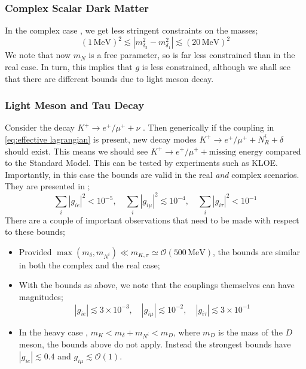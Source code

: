 \documentclass[11pt]{article}
\numberwithin{equation}{section}
\numberwithin{figure}{section}
\numberwithin{table}{section}
\newcommand{\mO}{\mathcal{O}}
\newcommand{\Abs}[1]{\left| #1 \right|}
\begin{document}
\subsubsection*{Complex Scalar Dark Matter}
In the complex case \cite{Boehm2006}, we get less stringent constraints on the masses;
  \begin{equation}
    (1\, \text{MeV})^2 \lesssim \Abs{m_{\delta_2}^2 - m_{\delta_1}^2} \lesssim (20 \, \text{MeV})^2
  \end{equation}
\noindent We note that now $m_N$ is a free parameter, so is far less constrained than in the real case. In turn, this implies that $g$ is less constrained, although we shall see that there are different bounds due to light meson decay.



\subsubsection{Light Meson and Tau Decay}


Consider the decay $K^+ \rightarrow e^+/\mu^+ + \nu$ \cite{Farzan2011, Farzan2014, Farzan2010}. Then generically if the coupling in \eqref{eq:effective lagrangian} is present, new decay modes $K^+ \rightarrow e^+/\mu^+ + N^i_R + \delta$ should exist. This means we should see $K^+ \rightarrow e^+/\mu^+ + \text{missing energy}$ compared to the Standard Model. This can be tested by experiments such as KLOE. Importantly, in this case the bounds are valid in the real \emph{and} complex scenarios. They are presented in \cite{Farzan2011, Farzan2014, Farzan2010, Artamonov2016};
  \begin{equation}
    \sum_{i}{\Abs{g_{ie}}^2} < 10^{-5}, \quad \sum_{i}{\Abs{g_{i\mu}}^2} \lesssim 10^{-4}, \quad \sum_{i}{\Abs{g_{i\tau}}^2} < 10^{-1}
  \end{equation}
\noindent There are a couple of important observations that need to be made with respect to these bounds;
\begin{itemize}
  \item Provided $\max(m_\delta, m_{N^i}) \ll m_{K, \pi} \simeq \mO(500\,\text{MeV})$, the bounds are similar in both the complex and the real case;
  \item With the bounds as above, we note that the couplings themselves can have magnitudes;
  \begin{equation}
    \label{eq:constraints}
    \Abs{g_{ie}} \lesssim 3 \times 10^{-3}, \quad \Abs{g_{i\mu}} \lesssim 10^{-2}, \quad \Abs{g_{i\tau}} \lesssim 3 \times 10^{-1}
  \end{equation}
  \item In the heavy case \cite{Farzan2014}, $m_K < m_\delta + m_{N^i} < m_D$, where $m_D$ is the mass of the $D$ meson, the bounds above do not apply. Instead the strongest bounds have $\Abs{g_{ie}} \lesssim 0.4$ and $g_{i\mu} \lesssim \mO(1)$.
\end{itemize}
\end{document}
